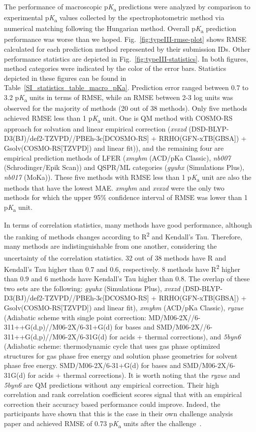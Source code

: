 \documentclass[9pt,lineno,final]{elife}
\newcommand{\pKa}{p\textit{K}\textsubscript{a}}
\begin{document}
The performance of macroscopic \pKa{} predictions were analyzed by comparison to experimental \pKa{} values collected by the spectrophotometric method via numerical matching following the Hungarian method.  
Overall \pKa{} prediction performance was worse than we hoped. 
Fig.~\ref{fig:typeIII-rmse-plot} shows RMSE calculated for each prediction method represented by their submission IDs. 
Other performance statistics are depicted in Fig.~\ref{fig:typeIII-statistics}.
In both figures, method categories were indicated by the color of the error bars.  Statistics depicted in these figures can be found in Table~\ref{SI_statistics_table_macro_pKa}.
Prediction error ranged between 0.7 to 3.2 \pKa{} units in terms of RMSE, while an RMSE between 2-3 log units was observed for the majority of methods (20 out of 38 methods). 
Only five methods achieved RMSE less than 1 \pKa{} unit. One is QM method with COSMO-RS approach for solvation and linear empirical correction (\textit{xvxzd} (DSD-BLYP-D3(BJ)/def2-TZVPD//PBEh-3c[DCOSMO-RS] + RRHO(GFN-xTB[GBSA]) + Gsolv(COSMO-RS[TZVPD]) and linear fit)), and the remaining four are empirical prediction methods of LFER (\textit{xmyhm} (ACD/pKa Classic), \textit{nb007} (Schrodinger/Epik Scan)) and QSPR/ML categories (\textit{gyuhx} (Simulations Plus), \textit{nb017} (MoKa)). 
These five methods with RMSE less than 1 \pKa{} unit are also the methods that have the lowest MAE.
\textit{xmyhm} and \textit{xvxzd} were the only two methods for which the upper 95\% confidence interval of RMSE was lower than 1 \pKa{} unit. 

In terms of correlation statistics, many methods have good performance, although the ranking of methods changes according to R\textsuperscript{2} and Kendall's Tau. Therefore, many methods are indistinguishable from one another, considering the uncertainty of the correlation statistics. 
32 out of 38 methods have R\textsuperscript{} and Kendall's Tau higher than 0.7 and 0.6, respectively.
8 methods have R\textsuperscript{2} higher than 0.9 and 6 methods have Kendall's Tau higher than 0.8.
The overlap of these two sets are the following:
\textit{gyuhx} (Simulations Plus), \textit{xvxzd} (DSD-BLYP-D3(BJ)/def2-TZVPD//PBEh-3c[DCOSMO-RS] + RRHO(GFN-xTB[GBSA]) + Gsolv(COSMO-RS[TZVPD]) and linear fit), \textit{xmyhm} (ACD/pKa Classic), \textit{ryzue} (Adiabatic scheme with single point correction: MD/M06-2X//6-311++G(d,p)//M06-2X/6-31+G(d) for bases and SMD/M06-2X//6-311++G(d,p)//M06-2X/6-31G(d) for acids + thermal corrections), and \textit{5byn6} 
(Adiabatic scheme: thermodynamic cycle that uses gas phase optimized structures for gas phase free energy and solution phase geometries for solvent phase free energy. SMD/M06-2X/6-31+G(d) for bases and SMD/M06-2X/6-31G(d) for acids + thermal corrections).
It is worth noting that the \textit{ryzue} and \textit{5byn6} are QM predictions without any empirical correction. Their high correlation and rank correlation coefficient scores signal that with an empirical correction their accuracy based performance could improve. Indeed, the participants have shown that this is the case in their own challenge analysis paper and achieved RMSE of 0.73 \pKa{} units after the challenge~\citep{Zeng:2018:J.Comput.AidedMol.Des.}. 
\end{document}
